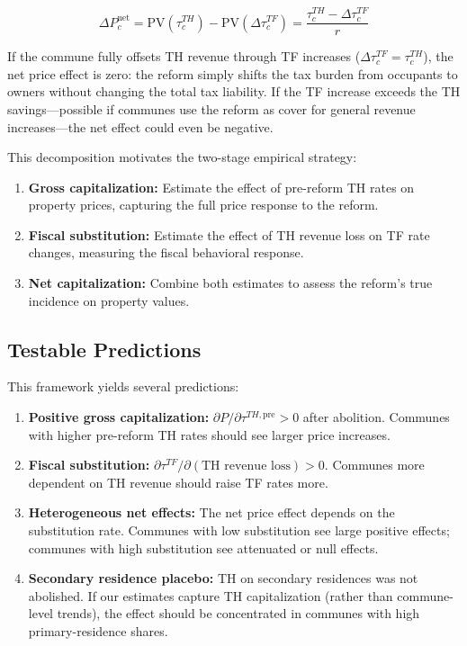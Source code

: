 \documentclass[12pt]{article}
\begin{document}
\begin{equation}
    \Delta P_c^{\text{net}} = \text{PV}(\tau^{TH}_c) - \text{PV}(\Delta \tau^{TF}_c) = \frac{\tau^{TH}_c - \Delta \tau^{TF}_c}{r}
    \label{eq:net}
\end{equation}

If the commune fully offsets TH revenue through TF increases ($\Delta \tau^{TF}_c = \tau^{TH}_c$), the net price effect is zero: the reform simply shifts the tax burden from occupants to owners without changing the total tax liability. If the TF increase exceeds the TH savings---possible if communes use the reform as cover for general revenue increases---the net effect could even be negative.

This decomposition motivates the two-stage empirical strategy:

\begin{enumerate}
    \item \textbf{Gross capitalization:} Estimate the effect of pre-reform TH rates on property prices, capturing the full price response to the reform.
    \item \textbf{Fiscal substitution:} Estimate the effect of TH revenue loss on TF rate changes, measuring the fiscal behavioral response.
    \item \textbf{Net capitalization:} Combine both estimates to assess the reform's true incidence on property values.
\end{enumerate}

\subsection{Testable Predictions}

This framework yields several predictions:

\begin{enumerate}
    \item \textbf{Positive gross capitalization:} $\partial P / \partial \tau^{TH,\text{pre}} > 0$ after abolition. Communes with higher pre-reform TH rates should see larger price increases.
    \item \textbf{Fiscal substitution:} $\partial \tau^{TF} / \partial (\text{TH revenue loss}) > 0$. Communes more dependent on TH revenue should raise TF rates more.
    \item \textbf{Heterogeneous net effects:} The net price effect depends on the substitution rate. Communes with low substitution see large positive effects; communes with high substitution see attenuated or null effects.
    \item \textbf{Secondary residence placebo:} TH on secondary residences was not abolished. If our estimates capture TH capitalization (rather than commune-level trends), the effect should be concentrated in communes with high primary-residence shares.
\end{enumerate}
\end{document}
